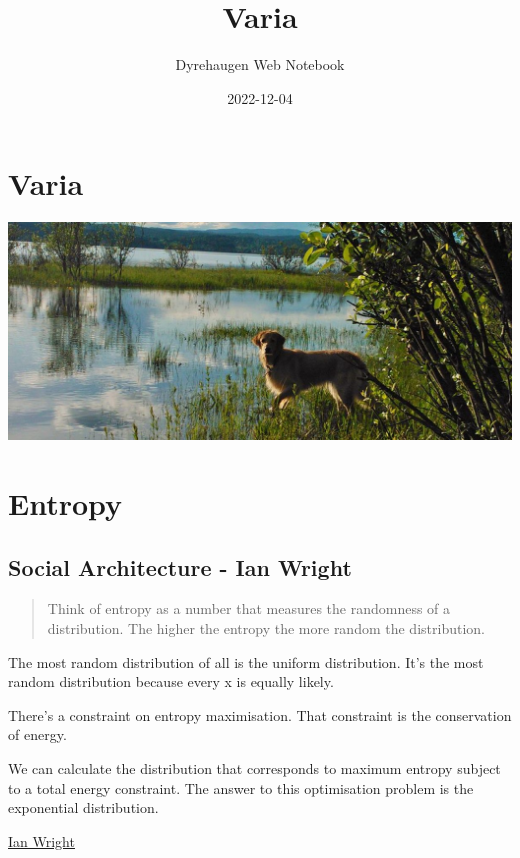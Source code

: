 \documentclass[
]{book}
\title{Varia}
\author{Dyrehaugen Web Notebook}
\date{2022-12-04}
\begin{document}
\maketitle

{
\setcounter{tocdepth}{1}
\tableofcontents
}
\hypertarget{varia}{%
\chapter{Varia}\label{varia}}

\includegraphics{fig/zelda.jpg}

\hypertarget{entropy}{%
\chapter{Entropy}\label{entropy}}

\hypertarget{social-architecture---ian-wright}{%
\section{Social Architecture - Ian Wright}\label{social-architecture---ian-wright}}

\begin{quote}
Think of entropy as a number that measures the randomness of a distribution.
The higher the entropy the more random the distribution.
\end{quote}

The most random distribution of all is the uniform distribution.
It's the most random distribution because every x is equally likely.

There's a constraint on entropy maximisation.
That constraint is the conservation of energy.

We can calculate the distribution that corresponds
to maximum entropy subject to a total energy constraint.
The answer to this optimisation problem is the exponential distribution.

\href{https://ianwrightsite.wordpress.com/2017/11/16/the-social-architecture-of-capitalism/}{Ian Wright}
\end{document}
